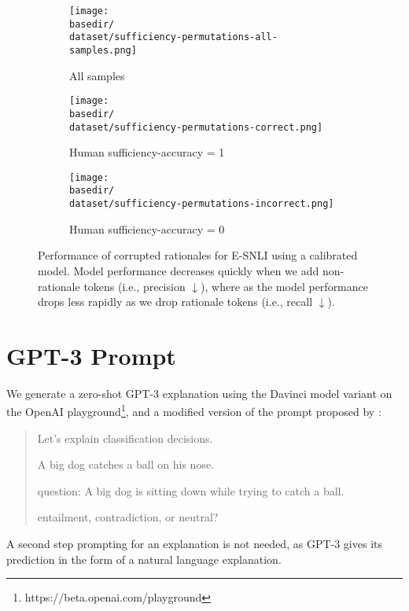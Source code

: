 \def \dataset {ensli-cal}
\def \basedir {new_plots}
\begin{figure*}[h]
\centering
\begin{subfigure}[t]{0.41\textwidth}
    \centering
    \texttt{[image: \\basedir/\\dataset/sufficiency-permutations-all-samples.png]}
    \caption{All samples}
    \label{fig:ensli_cal_perturbation_plots_all}
\end{subfigure}
\begin{subfigure}[t]{0.28\textwidth}
    \centering
    \texttt{[image: \\basedir/\\dataset/sufficiency-permutations-correct.png]}
    \caption{Human sufficiency-accuracy = 1}
    \label{fig:ensli_cal_perturbation_plots_suffacc_1}
\end{subfigure}
\begin{subfigure}[t]{0.28\textwidth}
    \centering
    \texttt{[image: \\basedir/\\dataset/sufficiency-permutations-incorrect.png]}
    \caption{Human sufficiency-accuracy = 0}
    \label{fig:ensli_cal_perturbation_plots_suffacc_0}
\end{subfigure}
\caption{Performance of corrupted rationales for E-SNLI using a calibrated model.
Model performance decreases quickly when we add non- rationale tokens (i.e., precision $\downarrow$), where as the model performance drops less rapidly as we drop rationale tokens (i.e., recall $\downarrow$).
}
\label{fig:ensli_cal_perturbation_plots}
\end{figure*}

\section{GPT-3 Prompt}
\label{subsec:appendix-gptprompt}
We generate a zero-shot GPT-3 \cite{brown_language_2020} explanation using the Davinci model variant on the OpenAI playground\footnote{https://beta.openai.com/playground}, and a modified version of the prompt proposed by \citet{wiegreffe_reframing_2021}: 

\begin{quote}

Let's explain classification decisions. 

A big dog catches a ball on his nose. 

question: A big dog is sitting down while trying to catch a ball. 

entailment, contradiction, or neutral? 

\end{quote}

A second step prompting for an explanation is not needed, as GPT-3 gives its prediction in the form of a natural language explanation. 